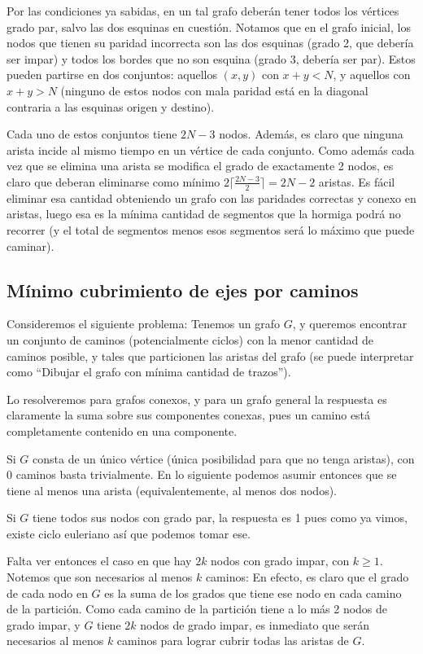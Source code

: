 \documentclass{article}
\begin{document}
Por las condiciones ya sabidas, en un tal grafo deberán tener todos los vértices grado par, salvo las dos esquinas en cuestión. Notamos que en el grafo inicial, los nodos que tienen su paridad incorrecta son las dos esquinas (grado 2, que debería ser impar) y todos los bordes que no son esquina (grado 3, debería ser par). Estos pueden partirse en dos conjuntos: aquellos $(x,y)$ con $x+y < N$, y aquellos con $x+y > N$ (ninguno de estos nodos con mala paridad está en la diagonal contraria a las esquinas origen y destino).

Cada uno de estos conjuntos tiene $2N-3$ nodos. Además, es claro que ninguna arista incide al mismo tiempo en un vértice de cada conjunto. Como además cada vez que se elimina una arista se modifica el grado de exactamente 2 nodos, es claro que deberan eliminarse como mínimo $2\lceil \frac{2N-3}{2} \rceil = 2N - 2$ aristas. Es fácil eliminar esa cantidad obteniendo un grafo con las paridades correctas y conexo en aristas, luego esa es la mínima cantidad de segmentos que la hormiga podrá no recorrer (y el total de segmentos menos esos segmentos será lo máximo que puede caminar).

\subsection{Mínimo cubrimiento de ejes por caminos}

Consideremos el siguiente problema: Tenemos un grafo $G$, y queremos encontrar un conjunto de caminos (potencialmente ciclos) con la
menor cantidad de caminos posible, y tales que particionen las aristas del grafo
(se puede interpretar como ``Dibujar el grafo con mínima cantidad de trazos'').

Lo resolveremos para grafos conexos, y para un grafo general la respuesta es claramente la suma sobre sus componentes conexas, pues
un camino está completamente contenido en una componente.

Si $G$ consta de un único vértice (única posibilidad para que no tenga aristas), con 0 caminos basta trivialmente. En lo siguiente
podemos asumir entonces que se tiene al menos una arista (equivalentemente, al menos dos nodos).

Si $G$ tiene todos sus nodos con grado par, la respuesta es 1 pues como ya vimos, existe ciclo euleriano así que podemos tomar ese.

Falta ver entonces el caso en que hay $2k$ nodos con grado impar, con $k \geq 1$. Notemos que son necesarios al menos $k$ caminos: En efecto,
es claro que el grado de cada nodo en $G$ es la suma de los grados que tiene ese nodo en cada camino de la partición. Como cada camino de
la partición tiene a lo más 2 nodos de grado impar, y $G$ tiene $2k$ nodos de grado impar, es inmediato que serán necesarios al menos $k$
caminos para lograr cubrir todas las aristas de $G$.
\end{document}
